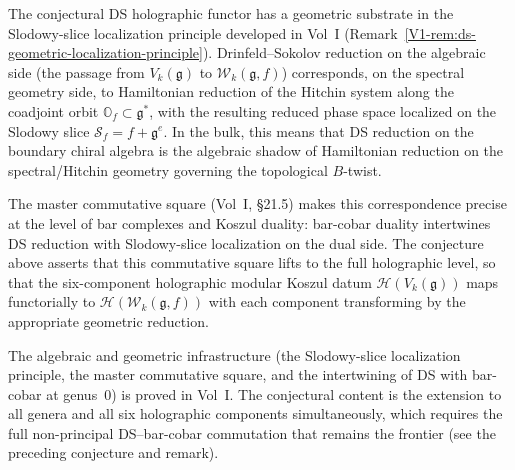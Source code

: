 \begin{remark}
\label{rem:ds-holographic-geometric-content}
\ClaimStatusConjectured
{}
The conjectural DS holographic functor has a geometric substrate in
the Slodowy-slice localization principle developed in
Vol~I (Remark~\ref*{V1-rem:ds-geometric-localization-principle}).
Drinfeld--Sokolov reduction on the algebraic side
(the passage from $V_k(\mathfrak{g})$ to
$\mathcal{W}_k(\mathfrak{g}, f)$) corresponds, on the spectral
geometry side, to Hamiltonian reduction of the Hitchin system along
the coadjoint orbit $\mathbb{O}_f \subset \mathfrak{g}^*$, with the
resulting reduced phase space localized on the Slodowy slice
$\mathcal{S}_f = f + \mathfrak{g}^e$. In the bulk, this means that
DS reduction on the boundary chiral algebra is the algebraic shadow
of Hamiltonian reduction on the spectral/Hitchin geometry governing
the topological $B$-twist.

The master commutative square (Vol~I, \S21.5)
makes this correspondence precise at the level
of bar complexes and Koszul duality: bar-cobar duality intertwines
DS reduction with Slodowy-slice localization on the dual side. The
conjecture above asserts that this commutative square lifts to the
full holographic level, so that the six-component holographic modular
Koszul datum $\mathcal{H}(V_k(\mathfrak{g}))$ maps functorially to
$\mathcal{H}(\mathcal{W}_k(\mathfrak{g}, f))$ with each component
transforming by the appropriate geometric reduction.

The algebraic and geometric infrastructure
(the Slodowy-slice localization principle, the master commutative
square, and the intertwining of DS with bar-cobar at genus~$0$)
is proved in Vol~I. The conjectural content is the extension to all
genera and all six holographic components simultaneously, which
requires the full non-principal DS--bar-cobar commutation that
remains the frontier (see the preceding conjecture and remark).
\end{remark}


